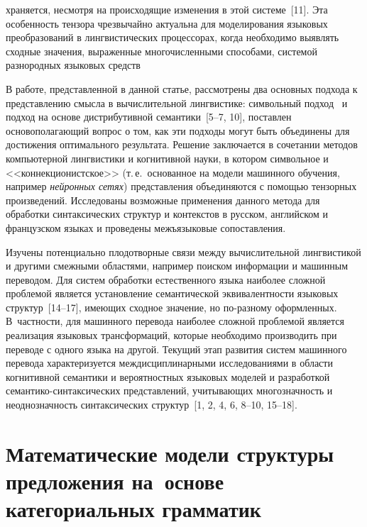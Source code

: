 \begin{multicols}{2}
\pagebreak

\noindent
храняется, несмотря на происходящие 
изменения в этой системе~[11]. Эта особенность тензора чрезвычайно 
актуальна для моделирования языковых преобразований в лингвистических 
процессорах, когда необходимо выявлять сходные значения, выраженные 
многочисленными способами, системой разнородных языковых средств 
  
  В работе, представленной в данной статье, рассмотрены два основных 
подхода к представлению смысла в вычислительной лингвистике: 
символьный подход~\cite{13-koz, 14-koz} и подход на основе 
дистрибутивной семантики~[5--7, 10], поставлен основополагающий вопрос о 
том, как эти подходы могут быть объединены для достижения оптимального 
результата. Решение заключается в сочетании методов компьютерной 
лингвистики и когнитивной науки, в котором символьное и 
<<коннекционистское>> (т.\,е.\ основанное на модели машинного обучения, 
например \textit{нейронных сетях}) представления объединяются с 
  по\-мощью тензорных произведений. Исследованы возможные применения 
данного метода для обработки синтаксических структур и контекстов в 
русском, английском и французском языках и проведены межъязыковые 
сопоставления. 
  
  Изучены потенциально плодотворные связи между вычислительной 
лингвистикой и другими смежными областями, например поиском 
информации и машинным переводом. Для сис\-тем обработки естественного 
языка наиболее сложной проблемой является установление семантической 
эквивалентности языковых структур~[14--17], %
имеющих сходное значение, но по-разному оформленных. В~частности, для 
машинного перевода наиболее сложной проблемой является реализация 
языковых трансформаций, которые необходимо производить при переводе с 
одного языка на другой. Текущий этап развития систем машинного перевода 
характеризуется междисциплинарными исследованиями в области 
когнитивной семантики и вероятностных языковых моделей и разработкой 
се\-ман\-ти\-ко-син\-так\-си\-че\-ских представлений, учитывающих 
многозначность и неоднозначность синтаксических 
  структур~[1, 2, 4, 6, 8--10, 15--18].
  
  \vspace*{-12pt}
     
    \section{Математические модели структуры предложения 
    на~основе категориальных грамматик}
    

\end{multicols}
